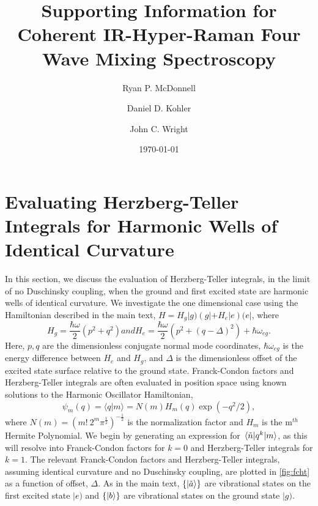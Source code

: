 \documentclass[aip, jcp, reprint, onecolumn, nofootinbib]{revtex4-2}
\begin{document}
\title{Supporting Information for Coherent IR-Hyper-Raman Four Wave Mixing Spectroscopy}


\author{Ryan P. McDonnell} 
\author{Daniel D. Kohler}
\author{John C. Wright} 


\date{\today}

\maketitle
\tableofcontents
\clearpage


\section{Evaluating Herzberg-Teller Integrals for Harmonic Wells of Identical Curvature}
In this section, we discuss the evaluation of Herzberg-Teller integrals, in the limit of no Duschinsky coupling, when the ground and first excited state are harmonic wells of identical curvature.\cite{HerzbergTeller1933, Duschinsky1937}
We investigate the one dimensional case using the Hamiltonian described in the main text, $H = H_g |g) \left(g| + H_e |e\right) (e|$, where
\begin{subequations}\label{Hamiltonian}
	\begin{equation}
		H_g = \frac{\hbar \omega }{2} \left(p^2 + q^2 \right)
	\end{equation}
	and
	\begin{equation}
		H_e = \frac{\hbar \omega }{2} \left(p^2 +  (q-\Delta)^2 \right) + \hbar \omega_{eg}.
	\end{equation} 
\end{subequations}
Here, $p,q$ are the dimensionless conjugate normal mode coordinates, $\hbar\omega_{eg}$ is the energy difference between $H_e$ and $H_g$, and $\Delta$ is the dimensionless offset of the excited state surface relative to the ground state.
Franck-Condon factors and Herzberg-Teller integrals are often evaluated in position space using known solutions to the Harmonic Oscillator Hamiltonian, 
\begin{equation}
	\psi_m(q) = \langle q | m \rangle = N(m) H_m(q) \exp(-q^2/2),
\end{equation}
where $N(m) = (m! \ 2^m \pi^{\frac{1}{2}})^{-\frac{1}{2}}$ is the normalization factor and $H_m$ is the m$^{th}$ Hermite Polynomial.\cite{RN230}
We begin by generating an expression for $\mel{\tilde{n}}{q^k}{m}$, as this will resolve into Franck-Condon factors for $k = 0$ and Herzberg-Teller integrals for $k=1$.
The relevant Franck-Condon factors and Herzberg-Teller integrals, assuming identical curvature and no Duschinsky coupling, are plotted in \autoref{fig:fcht} as a function of offset, $\Delta$.
As in the main text, $\{\ket{\tilde{a}}\}$ are vibrational states on the first excited state $|e)$ and $\{\ket{b}\}$ are vibrational states on the ground state $|g)$.
\end{document}
